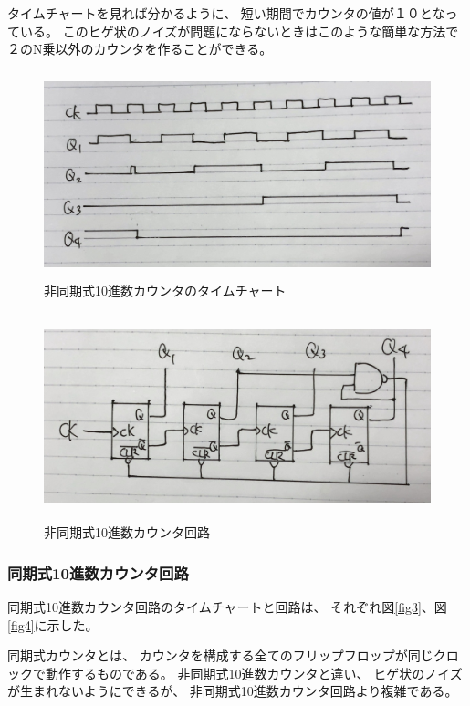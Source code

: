 \documentclass[12pt]{jarticle}
\begin{document}
タイムチャートを見れば分かるように、
短い期間でカウンタの値が１０となっている。
このヒゲ状のノイズが問題にならないときはこのような簡単な方法で
２のN乗以外のカウンタを作ることができる。
\begin{figure}[h]
    \begin{center}
        \includegraphics[bb=0 0 2301 1109,height=6cm]{report3_fig5.jpg}
    \end{center}
    \caption{非同期式10進数カウンタのタイムチャート}
    \label{fig5}
\end{figure}
\begin{figure}[h]
    \begin{center}
        \includegraphics[bb=0 0 2056 921,height=6cm]{report3_fig6.jpg}
    \end{center}
    \caption{非同期式10進数カウンタ回路}
    \label{fig6}
\end{figure}

\clearpage
\subsubsection*{同期式10進数カウンタ回路}
同期式10進数カウンタ回路のタイムチャートと回路は、
それぞれ図\ref{fig3}、図\ref{fig4}に示した。

同期式カウンタとは、
カウンタを構成する全てのフリップフロップが同じクロックで動作するものである。
非同期式10進数カウンタと違い、
ヒゲ状のノイズが生まれないようにできるが、
非同期式10進数カウンタ回路より複雑である。
\end{document}
